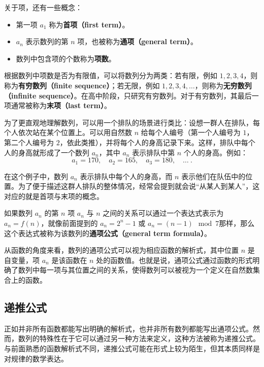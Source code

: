 关于项，还有一些概念：
\begin{itemize}
\item 第一项 $a_1$ 称为\textbf{首项（first term）}。 
\item $a_n$ 表示数列的第 $n$ 项，也被称为\textbf{通项（general term）}。
\item 数列中包含项的个数称为\textbf{项数}。
\end{itemize}

根据数列中项数是否为有限值，可以将数列分为两类：若有限，例如 $1, 2, 3, 4$，则称为\textbf{有穷数列（finite sequence）}；若无限，例如 $1, 2, 3, 4, \dots$，则称为\textbf{无穷数列（infinite sequence）}。在高中阶段，只研究有穷数列。对于有穷数列，其最后一项通常被称为\textbf{末项（last term）}。

为了更直观地理解数列，可以用一个排队的场景进行类比：设想一群人在排队，每个人依次站在某个位置上。可以用自然数 $n$ 给每个人编号（第一个人编号为 $1$，第二个人编号为 $2$，依此类推），并将每个人的身高记录下来。这样，排队中每个人的身高就形成了一个数列 ${a_n}$，其中 $a_n$ 表示排队中第 $n$ 个人的身高。例如：
\begin{equation}
a_1 = 170, \quad a_2 = 165, \quad a_3 = 180, \quad \dots~.
\end{equation}

在这个例子中，数列 ${a_n}$ 表示排队中每个人的身高，而 $n$ 表示他们在队伍中的位置。为了便于描述这群人排队的整体情况，经常会提到就会说“从某人到某人”，这对应的就是首项与末项的概念。

如果数列 ${a_n}$ 的第 $n$ 项 $a_n$ 与 $n$ 之间的关系可以通过一个表达式表示为 $a_n = f(n)$，就像前面提到的 $a_n = 2^n - 1$ 或 $a_n = (n-1) \mod 7$那样，那么这个表达式被称为该数列的\textbf{通项公式（general term formula）}。

从函数的角度来看，数列的通项公式可以视为相应函数的解析式，其中位置 $n$ 是自变量，项 $a_n$ 是该函数在 $n$ 处的函数值。也就是说，通项公式通过函数的形式明确了数列中每一项与其位置之间的关系，使得数列可以被视为一个定义在自然数集合上的函数。

\subsection{递推公式}

正如并非所有函数都能写出明确的解析式，也并非所有数列都能写出通项公式。然而，数列的特殊性在于它可以通过另一种方法来定义，这种方法被称为递推公式。与前面熟悉的函数解析式不同，递推公式可能在形式上较为陌生，但其本质同样是对规律的数学表达。

